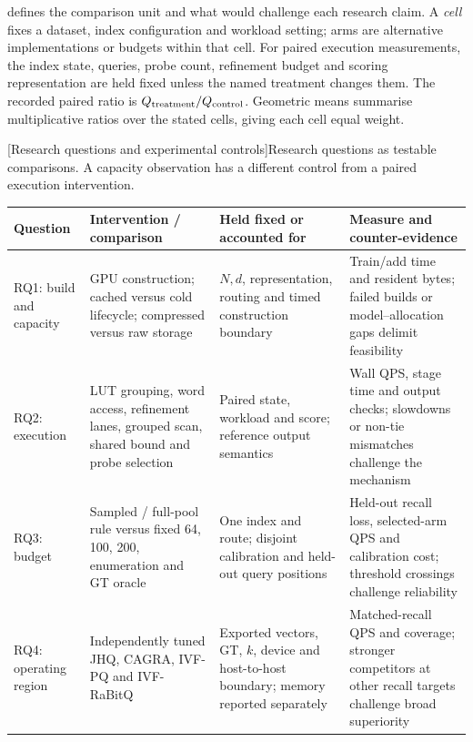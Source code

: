  defines the comparison unit and what would challenge
each research claim. A \emph{cell} fixes a dataset, index configuration and
workload setting; arms are alternative implementations or budgets within
that cell. For paired execution measurements, the index state, queries,
probe count, refinement budget and scoring representation are held fixed
unless the named treatment changes them. The recorded paired ratio is
$Q_{\rm treatment}/Q_{\rm control}$. Geometric means summarise multiplicative
ratios over the stated cells, giving each cell equal weight.

\par\medskip\noindent\begin{minipage}{\linewidth}
\centering\captionsetup{hypcap=false}
[Research questions and experimental controls]{Research questions as testable comparisons. A capacity observation
has a different control from a paired execution intervention.}
\label{tab:3-design}
\footnotesize\setlength{\tabcolsep}{3pt}
\begin{tabularx}{\linewidth}{@{}>{\raggedright\arraybackslash}p{.11\linewidth}*{3}{>{\raggedright\arraybackslash}X}@{}}
\toprule
Question & Intervention / comparison & Held fixed or accounted for & Measure and counter-evidence \\
\midrule
RQ1: build and capacity & GPU construction; cached versus cold lifecycle;
compressed versus raw storage & $N,d$, representation, routing and timed
construction boundary & Train/add time and resident bytes; failed builds
or model--allocation gaps delimit feasibility \\
RQ2: execution & LUT grouping, word access, refinement lanes, grouped scan,
shared bound and probe selection & Paired state, workload and score;
reference output semantics & Wall QPS, stage time and output checks;
slowdowns or non-tie mismatches challenge the mechanism \\
RQ3: budget & Sampled / full-pool rule versus fixed 64, 100, 200,
enumeration and GT oracle & One index and route; disjoint calibration
and held-out query positions & Held-out recall loss, selected-arm QPS
and calibration cost; threshold crossings challenge reliability \\
RQ4: operating region & Independently tuned JHQ, CAGRA, IVF-PQ and
IVF-RaBitQ & Exported vectors, GT, $k$, device and host-to-host boundary;
memory reported separately & Matched-recall QPS and coverage; stronger
competitors at other recall targets challenge broad superiority \\
\bottomrule
\end{tabularx}
\end{minipage}\par\medskip

